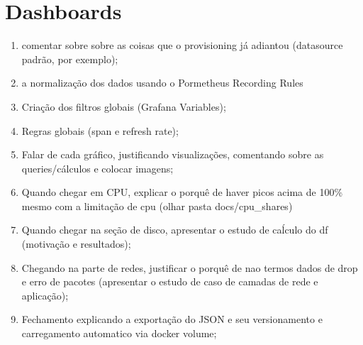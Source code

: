 

{\color{blue}
\section{Dashboards}

\begin{enumerate}  
  \item comentar sobre sobre as coisas que o provisioning já adiantou (datasource padrão, por exemplo);
  \item a normalização dos dados usando o Pormetheus Recording Rules
  \item Criação dos filtros globais (Grafana Variables);
  \item Regras globais (span e refresh rate);
  \item Falar de cada gráfico, justificando visualizações, comentando sobre as queries/cálculos e colocar imagens;
  \item Quando chegar em CPU, explicar o porquê de haver picos acima de 100\% mesmo com a limitação de cpu (olhar pasta docs/cpu\_shares)
  \item Quando chegar na seção de disco, apresentar o estudo de caĺculo do df (motivação e resultados);
  \item Chegando na parte de redes, justificar o porquê de nao termos dados de drop e erro de pacotes (apresentar o estudo de caso de camadas de rede e aplicação);
  \item Fechamento explicando a exportação do JSON e seu versionamento e carregamento automatico via docker volume;
\end{enumerate}


}
